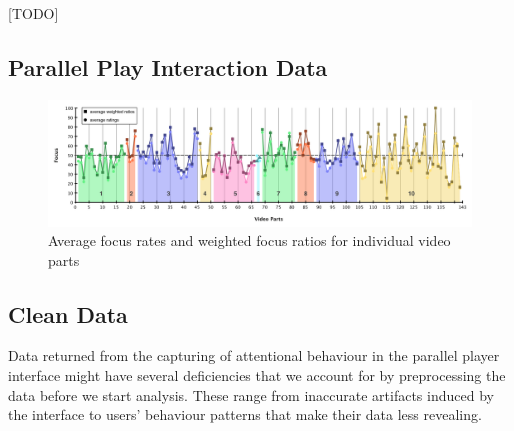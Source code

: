 [TODO]

\subsection{Parallel Play Interaction Data} %
\label{sub:parallel_play_interaction_data}

\begin{figure}[htbp]
  \centering
    \includegraphics[width=\textwidth]{img/videoparts_focus}
  \caption{Average focus rates and weighted focus ratios for individual video parts}
  \label{fig:videoparts_focus}
\end{figure}

% 



\subsection{Clean Data} %
\label{sub:clean_data}

Data returned from the capturing of attentional behaviour in the parallel player interface might have several deficiencies that we account for by preprocessing the data before we start analysis. These range from inaccurate artifacts induced by the interface to users' behaviour patterns that make their data less revealing.


